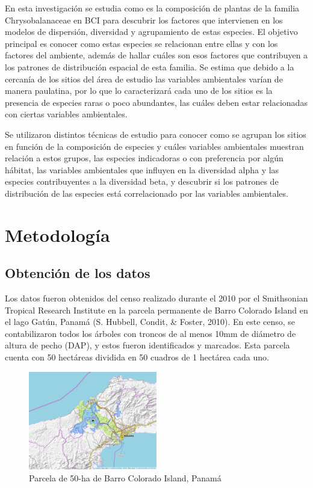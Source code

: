 \documentclass[11pt,]{article}
\begin{document}
En esta investigación se estudia como es la composición de plantas de la
familia Chrysobalanaceae en BCI para descubrir los factores que
intervienen en los modelos de dispersión, diversidad y agrupamiento de
estas especies. El objetivo principal es conocer como estas especies se
relacionan entre ellas y con los factores del ambiente, además de hallar
cuáles son esos factores que contribuyen a los patrones de distribución
espacial de esta familia. Se estima que debido a la cercanía de los
sitios del área de estudio las variables ambientales varían de manera
paulatina, por lo que lo caracterizará cada uno de los sitios es la
presencia de especies raras o poco abundantes, las cuáles deben estar
relacionadas con ciertas variables ambientales.

Se utilizaron distintos técnicas de estudio para conocer como se agrupan
los sitios en función de la composición de especies y cuáles variables
ambientales muestran relación a estos grupos, las especies indicadoras o
con preferencia por algún hábitat, las variables ambientales que
influyen en la diversidad alpha y las especies contribuyentes a la
diversidad beta, y descubrir si los patrones de distribución de las
especies está correlacionado por las variables ambientales.

\section{Metodología}\label{metodologuxeda}

\subsection{Obtención de los datos}\label{obtenciuxf3n-de-los-datos}

Los datos fueron obtenidos del censo realizado durante el 2010 por el
Smithsonian Tropical Research Institute en la parcela permanente de
Barro Colorado Island en el lago Gatún, Panamá (S. Hubbell, Condit, \&
Foster, 2010). En este censo, se contabilizaron todos los árboles con
troncos de al menos 10mm de diámetro de altura de pecho (DAP), y estos
fueron identificados y marcados. Esta parcela cuenta con 50 hectáreas
dividida en 50 cuadros de 1 hectárea cada uno.

\begin{figure}
\centering
\includegraphics[width=0.50000\textwidth]{mapa_cuadros_panama.png}
\caption{Parcela de 50-ha de Barro Colorado Island,
Panamá\label{mapaBCIcuadros}}
\end{figure}
\end{document}
